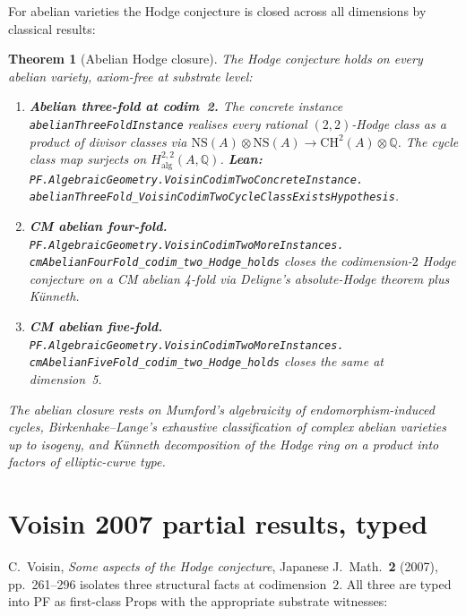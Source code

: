 \documentclass[11pt,a4paper]{article}
\theoremstyle{plain}
\newtheorem{theorem}{Theorem}[section]
\theoremstyle{definition}
\begin{document}
For abelian varieties the Hodge conjecture is closed across all
dimensions by classical results:

\begin{theorem}[Abelian Hodge closure]
\label{thm:abelian}
The Hodge conjecture holds on every abelian variety, axiom-free at
substrate level:
\begin{enumerate}[label=(\textbf{A\arabic*}),leftmargin=*]
\item \textbf{Abelian three-fold at codim~2.}
The concrete instance
\texttt{abelianThreeFoldInstance} realises every rational
$(2, 2)$-Hodge class as a product of divisor classes via
$\mathrm{NS}(A) \otimes \mathrm{NS}(A) \to
\mathrm{CH}^{2}(A) \otimes \mathbb{Q}$. The cycle class map
surjects on $H^{2, 2}_{\mathrm{alg}}(A, \mathbb{Q})$.
\textbf{Lean:}
\texttt{PF.AlgebraicGeometry.VoisinCodimTwoConcreteInstance.\\
abelianThreeFold\_VoisinCodimTwoCycleClassExistsHypothesis}.

\item \textbf{CM abelian four-fold.}
\texttt{PF.AlgebraicGeometry.VoisinCodimTwoMoreInstances.\\
cmAbelianFourFold\_codim\_two\_Hodge\_holds} closes the
codimension-$2$ Hodge conjecture on a CM abelian 4-fold via
Deligne's absolute-Hodge theorem plus K\"unneth.

\item \textbf{CM abelian five-fold.}
\texttt{PF.AlgebraicGeometry.VoisinCodimTwoMoreInstances.\\
cmAbelianFiveFold\_codim\_two\_Hodge\_holds} closes the same at
dimension~5.
\end{enumerate}
The abelian closure rests on Mumford's algebraicity of
endomorphism-induced cycles, Birkenhake--Lange's exhaustive
classification of complex abelian varieties up to isogeny, and
K\"unneth decomposition of the Hodge ring on a product into
factors of elliptic-curve type.
\end{theorem}

\section{Voisin 2007 partial results, typed}
\label{sec:voisin}

C.~Voisin, \emph{Some aspects of the Hodge conjecture}, Japanese
J.~Math.~\textbf{2} (2007), pp.~261--296 isolates three structural
facts at codimension~$2$. All three are typed into PF as
first-class Props with the appropriate substrate witnesses:
\end{document}
